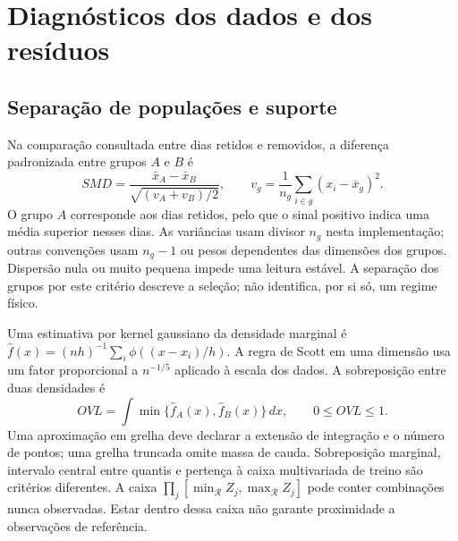
\section{Diagnósticos dos dados e dos resíduos}
\label{sec:mat-diagnosticos}

\subsection{Separação de populações e suporte}
\label{sec:mat-suporte}
Na comparação consultada entre dias retidos e removidos, a diferença padronizada entre grupos $A$ e $B$ é
\begin{equation}
SMD=\frac{\bar x_A-\bar x_B}{\sqrt{(v_A+v_B)/2}},
\qquad v_g=\frac1{n_g}\sum_{i\in g}(x_i-\bar x_g)^2.
\label{eq:mat-smd}
\end{equation}
O grupo $A$ corresponde aos dias retidos, pelo que o sinal positivo indica uma média superior nesses dias. As variâncias usam divisor $n_g$ nesta implementação; outras convenções usam $n_g-1$ ou pesos dependentes das dimensões dos grupos. Dispersão nula ou muito pequena impede uma leitura estável. A separação dos grupos por este critério descreve a seleção; não identifica, por si só, um regime físico.

Uma estimativa por kernel gaussiano da densidade marginal é $\widehat f(x)=(nh)^{-1}\sum_i\phi((x-x_i)/h)$. A regra de Scott em uma dimensão usa um fator proporcional a $n^{-1/5}$ aplicado à escala dos dados. A sobreposição entre duas densidades é
\begin{equation}
OVL=\int\min\{\widehat f_A(x),\widehat f_B(x)\}\,dx,
\qquad 0\leq OVL\leq1.
\label{eq:mat-overlap}
\end{equation}
Uma aproximação em grelha deve declarar a extensão de integração e o número de pontos; uma grelha truncada omite massa de cauda. Sobreposição marginal, intervalo central entre quantis e pertença à caixa multivariada de treino são critérios diferentes. A caixa $\prod_j[\min_{\mathcal R}Z_j,\max_{\mathcal R}Z_j]$ pode conter combinações nunca observadas. Estar dentro dessa caixa não garante proximidade a observações de referência.

